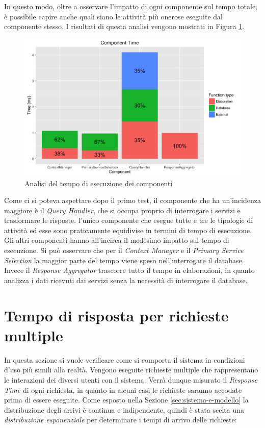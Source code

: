 In questo modo, oltre a osservare l'impatto di ogni componente sul tempo totale, è possibile capire anche quali siano le attività più onerose eseguite dal componente stesso. I risultati di questa analisi vengono mostrati in Figura \ref{fig:component-time}.

\begin{figure}[ht]
	\centering
	\includegraphics[width=\textwidth]{7-performance/Immagini/component_time.png}
	\caption{Analisi del tempo di esecuzione dei componenti}\label{fig:component-time}
\end{figure}

Come ci si poteva aspettare dopo il primo test, il componente che ha un'incidenza maggiore è il \emph{Query Handler}, che si occupa proprio di interrogare i servizi e trasformare le risposte. \upe l'unico componente che esegue tutte e tre le tipologie di attività ed esse sono praticamente equidivise in termini di tempo di esecuzione. Gli altri componenti hanno all'incirca il medesimo impatto sul tempo di esecuzione. Si può osservare che per il \emph{Context Manager} e il \emph{Primary Service Selection} la maggior parte del tempo viene speso nell'interrogare il database. Invece il \emph{Response Aggregator} trascorre tutto il tempo in elaborazioni, in quanto analizza i dati ricevuti dai servizi senza la necessità di interrogare il database.

\section{Tempo di risposta per richieste multiple\label{sec:analisi-response-time}}

In questa sezione si vuole verificare come si comporta il sistema in condizioni d'uso più simili alla realtà. Vengono eseguite richieste multiple che rappresentano le interazioni dei diversi utenti con il sistema. Verrà dunque misurato il \emph{Response Time} di ogni richiesta, in quanto in alcuni casi le richieste saranno accodate prima di essere eseguite. Come esposto nella Sezione \ref{sec:sistema-e-modello} la distribuzione degli arrivi è continua e indipendente, quindi è stata scelta una \emph{distribuzione esponenziale} per determinare i tempi di arrivo delle richieste:

